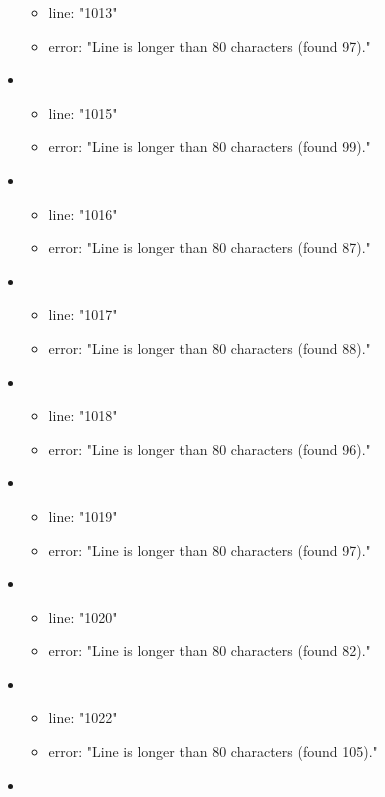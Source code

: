 \begin{itemize}
\begin{itemize}
		\item line: "1013" 
		\item error: "Line is longer than 80 characters (found 97)." 
	\end{itemize}
	\item 
	\begin{itemize} 
		\item line: "1015" 
		\item error: "Line is longer than 80 characters (found 99)." 
	\end{itemize}
	\item 
	\begin{itemize} 
		\item line: "1016" 
		\item error: "Line is longer than 80 characters (found 87)." 
	\end{itemize}
	\item 
	\begin{itemize} 
		\item line: "1017" 
		\item error: "Line is longer than 80 characters (found 88)." 
	\end{itemize}
	\item 
	\begin{itemize} 
		\item line: "1018" 
		\item error: "Line is longer than 80 characters (found 96)." 
	\end{itemize}
	\item 
	\begin{itemize} 
		\item line: "1019" 
		\item error: "Line is longer than 80 characters (found 97)." 
	\end{itemize}
	\item 
	\begin{itemize} 
		\item line: "1020" 
		\item error: "Line is longer than 80 characters (found 82)." 
	\end{itemize}
	\item 
	\begin{itemize} 
		\item line: "1022" 
		\item error: "Line is longer than 80 characters (found 105)." 
	\end{itemize}
	\item 
	\begin{itemize} 

\end{itemize}
\end{itemize}
